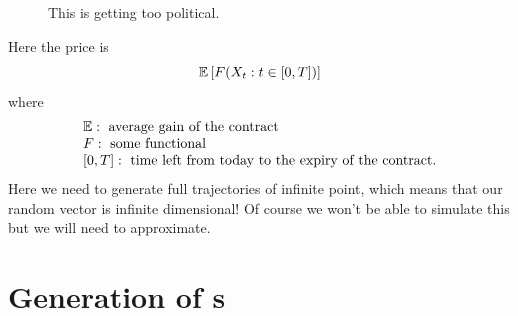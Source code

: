 \documentclass[12pt]{report}
\begin{document}
\begin{itemize}
\begin{figure}[H]
		\caption{This is getting too political.}
		\label{fig:screenshot060}
	\end{figure}
	Here the price is
	\begin{equation*}
		\mathbb{E}\left[F(X_{t}:t\in[0,T])\right]
	\end{equation*}
	where
		\begin{equation*}
			\begin{array}{l}
			\mathbb{E}:\text{ average gain of the contract}\\
			F:\text{ some functional}\\
			{[0,T]}:\text{ time left from today to the expiry of the contract.}
		\end{array}
		\end{equation*}
	Here we need to generate full trajectories of infinite point, which means that our random vector is infinite dimensional! Of course we won't be able to simulate this but we will need to approximate.
\end{itemize}
\section{Generation of \rv s}
\end{document}
